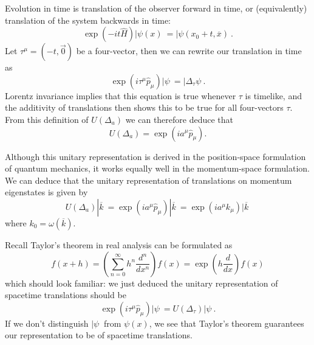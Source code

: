Evolution in time is translation of the observer forward in time,
or (equivalently) translation of the system backwards in time:
\begin{equation}%
\exp(-it\widehat{H})|\psi(x)\> = |\psi(x_{0}+t,\overline{x})\>.
\end{equation}
Let $\tau^{\mu}=(-t,\vec{0})$ be a four-vector, then we can
rewrite our translation in time as
\begin{equation}%
\exp(i\tau^{\mu}\widehat{p}_{\mu})|\psi\> = |\Delta_{\tau}\psi\>.
\end{equation}
Lorentz invariance implies that this equation is true whenever
$\tau$ is timelike, and the additivity of translations then shows
this to be true for all four-vectors $\tau$. From this definition
of $U(\Delta_{a})$ we can therefore deduce that
\begin{equation}%
U(\Delta_a) = \exp(ia^{\mu}\widehat{p}_{\mu}).
\end{equation}

Although this unitary representation is derived in the
position-space formulation of quantum mechanics, it works equally
well in the momentum-space formulation. We can deduce that the
unitary representation of translations on momentum eigenstates is
given by
\begin{equation}%
U(\Delta_{a})|\overline{k}\> =
\exp(ia^{\mu}\widehat{p}_{\mu})|\overline{k}\> = \exp(ia^{\mu}k_{\mu})|\overline{k}\>
\end{equation}
where $k_{0} = \omega(\overline{k})$.

\begin{rmk}
Recall Taylor's theorem in real analysis can be formulated as
\begin{equation}%
f(x+h) =
\left(\sum_{n=0}^{\infty}h^{n}\frac{d^{n}}{dx^{n}}\right)f(x) = \exp\left(h\frac{d}{dx}\right)f(x)
\end{equation}
which should look familiar: we just deduced the unitary
representation of spacetime translations should be
\begin{equation}%
\exp(i\tau^{\mu}\widehat{p}_{\mu})|\psi\> = U(\Delta_{\tau})|\psi\>.
\end{equation}
If we don't distinguish $|\psi\>$ from $\psi(x)$, we see that
Taylor's theorem guarantees our representation to be of spacetime
translations.
\end{rmk}
